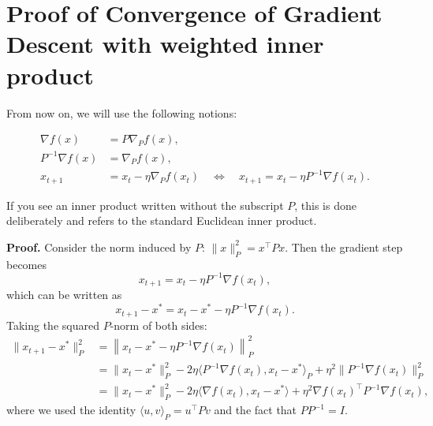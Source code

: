 \documentclass{article}
\begin{document}



\section*{Proof of Convergence of Gradient Descent with weighted inner product}

From now on, we will use the following notions:

\begin{align*}
    \nabla f(x) &= P \nabla_P f(x), \\
    P^{-1} \nabla f(x) &= \nabla_P f(x), \\
    x_{t+1} &= x_t - \eta \nabla_P f(x_t) 
    \quad \Leftrightarrow \quad 
    x_{t+1} = x_t - \eta P^{-1} \nabla f(x_t).
\end{align*}

If you see an inner product written without the subscript \(P\), this is done deliberately and refers to the standard Euclidean inner product. 

\textbf{Proof.} Consider the norm induced by \(P\): \( \|x\|_P^2 = x^\top P x \). Then the gradient step becomes
\[
x_{t+1} = x_t - \eta P^{-1} \nabla f(x_t),
\]
which can be written as
\[
x_{t+1} - x^* = x_t - x^* - \eta P^{-1} \nabla f(x_t).
\]
Taking the squared \(P\)-norm of both sides:
\begin{align*}
\|x_{t+1} - x^*\|_P^2 
&= \left\|x_t - x^* - \eta P^{-1} \nabla f(x_t)\right\|_P^2 \\
&= \|x_t - x^*\|_P^2 - 2\eta \langle P^{-1} \nabla f(x_t), x_t - x^* \rangle_P + \eta^2 \|P^{-1} \nabla f(x_t)\|_P^2 \\
&= \|x_t - x^*\|_P^2 - 2\eta \langle \nabla f(x_t), x_t - x^* \rangle + \eta^2 \nabla f(x_t)^\top P^{-1} \nabla f(x_t),
\end{align*}
where we used the identity \(\langle u, v \rangle_P = u^\top P v\) and the fact that \(P P^{-1} = I\).
\end{document}
